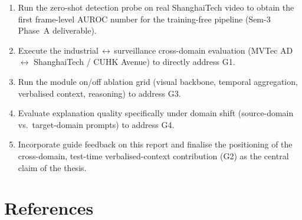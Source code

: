 \documentclass[12pt, a4paper]{article}
\begin{document}
\begin{enumerate}[leftmargin=1.6em, itemsep=0.4em]
    \item Run the zero-shot detection probe on real ShanghaiTech video to
    obtain the first frame-level AUROC number for the training-free
    pipeline (Sem-3 Phase~A deliverable).
    \item Execute the industrial\,$\leftrightarrow$\,surveillance
    cross-domain evaluation (MVTec AD $\leftrightarrow$ ShanghaiTech / CUHK
    Avenue) to directly address G1.
    \item Run the module on/off ablation grid (visual backbone, temporal
    aggregation, verbalised context, reasoning) to address G3.
    \item Evaluate explanation quality specifically under domain shift
    (source-domain vs.\ target-domain prompts) to address G4.
    \item Incorporate guide feedback on this report and finalise the
    positioning of the cross-domain, test-time verbalised-context
    contribution (G2) as the central claim of the thesis.
\end{enumerate}

\section{References}
\end{document}
